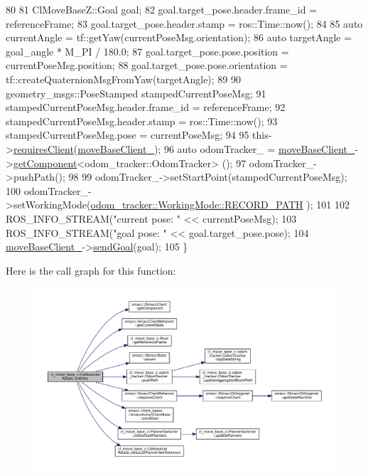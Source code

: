 \begin{DoxyCode}
80 
81     ClMoveBaseZ::Goal goal;
82     goal.target\_pose.header.frame\_id = referenceFrame;
83     goal.target\_pose.header.stamp = ros::Time::now();
84 
85     \textcolor{keyword}{auto} currentAngle = tf::getYaw(currentPoseMsg.orientation);
86     \textcolor{keyword}{auto} targetAngle = goal\_angle * M\_PI / 180.0;
87     goal.target\_pose.pose.position = currentPoseMsg.position;
88     goal.target\_pose.pose.orientation = tf::createQuaternionMsgFromYaw(targetAngle);
89 
90     geometry\_msgs::PoseStamped stampedCurrentPoseMsg;
91     stampedCurrentPoseMsg.header.frame\_id = referenceFrame;
92     stampedCurrentPoseMsg.header.stamp = ros::Time::now();
93     stampedCurrentPoseMsg.pose = currentPoseMsg;
94 
95     this->\hyperlink{classsmacc_1_1SmaccClientBehavior_a917f001e763a1059af337bf4e164f542}{requiresClient}(\hyperlink{classcl__move__base__z_1_1CbAbsoluteRotate_a8ddbef73316ff96f30493b28b5627e35}{moveBaseClient\_});
96     \textcolor{keyword}{auto} odomTracker\_ = \hyperlink{classcl__move__base__z_1_1CbAbsoluteRotate_a8ddbef73316ff96f30493b28b5627e35}{moveBaseClient\_}->\hyperlink{classsmacc_1_1ISmaccClient_adef78db601749ca63c19e74a27cb88cc}{getComponent}<odom\_tracker::OdomTracker>
      ();
97     odomTracker\_->pushPath();
98 
99     odomTracker\_->setStartPoint(stampedCurrentPoseMsg);
100     odomTracker\_->setWorkingMode(\hyperlink{namespacecl__move__base__z_1_1odom__tracker_ac46b05813b2791604f6cd0a39ace3ef8a023bc3adf68871ef7a0c616765ac80a7}{odom\_tracker::WorkingMode::RECORD\_PATH}
      );
101 
102     ROS\_INFO\_STREAM(\textcolor{stringliteral}{"current pose: "} << currentPoseMsg);
103     ROS\_INFO\_STREAM(\textcolor{stringliteral}{"goal pose: "} << goal.target\_pose.pose);
104     \hyperlink{classcl__move__base__z_1_1CbAbsoluteRotate_a8ddbef73316ff96f30493b28b5627e35}{moveBaseClient\_}->\hyperlink{classsmacc_1_1client__bases_1_1SmaccActionClientBase_a9c47a5094ac8afb01680307fe5eca922}{sendGoal}(goal);
105 \}
\end{DoxyCode}
Here is the call graph for this function\+:
\nopagebreak
\begin{figure}[H]
\begin{center}
\leavevmode
\includegraphics[width=350pt]{classcl__move__base__z_1_1CbAbsoluteRotate_a10418ea360809fa649d295716b152b2b_cgraph}
\end{center}
\end{figure}
